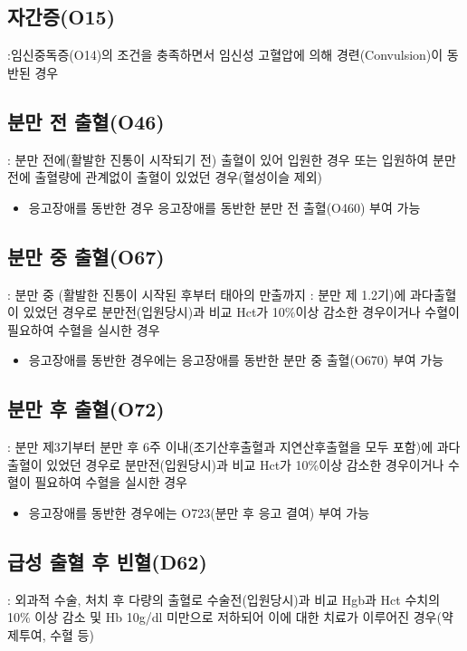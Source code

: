 \subsection*{자간증(O15)}\label{eclampsia}
 :임신중독증(O14)의 조건을 충족하면서 임신성 고혈압에 의해 경련(Convulsion)이 동반된 경우

\subsection*{분만 전 출혈(O46)}
 : 분만 전에(활발한 진통이 시작되기 전) 출혈이 있어 입원한 경우 또는 입원하여 분만 전에 출혈량에 관계없이 출혈이 있었던 경우(혈성이슬 제외)
\begin{itemize}\tightlist
\item 응고장애를 동반한 경우 응고장애를 동반한 분만 전 출혈(O460) 부여 가능
\end{itemize}

\subsection*{분만 중 출혈(O67)} : 분만 중 (활발한 진통이 시작된 후부터 태아의 만출까지 : 분만 제 1.2기)에 과다출혈이 있었던 경우로 분만전(입원당시)과 비교 Hct가 10\%이상 감소한 경우이거나 수혈이 필요하여 수혈을 실시한 경우
\begin{itemize}\tightlist
\item 응고장애를 동반한 경우에는 응고장애를 동반한 분만 중 출혈(O670) 부여 가능
\end{itemize}
\subsection*{분만 후 출혈(O72)} : 분만 제3기부터 분만 후 6주 이내(조기산후출혈과 지연산후출혈을 모두 포함)에 과다 출혈이 있었던 경우로 분만전(입원당시)과 비교 Hct가 10\%이상 감소한 경우이거나 수혈이 필요하여 수혈을 실시한 경우
\begin{itemize}\tightlist
\item 응고장애를 동반한 경우에는 O723(분만 후 응고 결여) 부여 가능
\end{itemize}

\subsection*{급성 출혈 후 빈혈(D62)} : 외과적 수술, 처치 후 다량의 출혈로 수술전(입원당시)과 비교 Hgb과 Hct 수치의 10\% 이상 감소 및 Hb 10g/dl 미만으로 저하되어 이에 대한 치료가 이루어진 경우(약제투여, 수혈 등)

